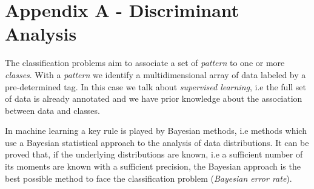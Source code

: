 \documentclass{standalone}
\begin{document}
\chapter*{Appendix A - Discriminant Analysis}

The classification problems aim to associate a set of \emph{pattern} to one or more \emph{classes}.
With a \emph{pattern} we identify a multidimensional array of data labeled by a pre-determined tag.
In this case we talk about \emph{supervised learning}, i.e the full set of data is already annotated and we have prior knowledge about the association between data and classes.

In machine learning a key rule is played by Bayesian methods, i.e methods which use a Bayesian statistical approach to the analysis of data distributions.
It can be proved that, if the underlying distributions are known, i.e a sufficient number of its moments are known with a sufficient precision, the Bayesian approach is the best possible method to face the classification problem (\emph{Bayesian error rate}\cite{Fukunaga:1990:ISP:92131}).
\end{document}
